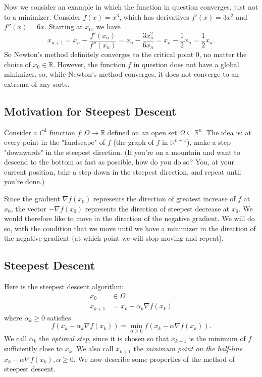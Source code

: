 \documentclass[11pt]{article}
\newcommand{\R}{\mathbb{R}}
\begin{document}
Now we consider an example in which the function in question converges, just not to a minimizer. Consider $f(x) = x^3$, which has derivatives $f'(x) = 3x^2$ and $f''(x) = 6x$. Starting at $x_0$, we have
\[
x_{n+1} = x_n - \frac{f'(x_n)}{f''(x_n)} = x_n - \frac{3x_n^2}{6x_n} = x_n - \frac{1}{2}x_n = \frac{1}{2}x_n.
\]
So Newton's method definitely converges to the critical point $0$, no matter the choice of $x_0 \in \R$. However, the function $f$ in question does not have a global minimizer, so, while Newton's method converges, it does not converge to an extrema of any sorts.

\subsection{Motivation for Steepest Descent}

Consider a $C^1$ function $f : \Omega \to \R$ defined on an open set $\Omega \subseteq \R^n$. The idea is: at every point in the "landscape" of $f$ (the graph of $f$ in $\R^{n+1}$), make a step "downwards" in the steepest direction. (If you're on a mountain and want to descend to the bottom as fast as possible, how do you do so? You, at your current position, take a step down in the steepest direction, and repeat until you're done.) 

Since the gradient $\nabla f(x_0)$ represents the direction of greatest increase of $f$ at $x_0$, the vector $-\nabla f(x_0)$ represents the direction of steepest decrease at $x_0$. We would therefore like to move in the direction of the negative gradient. We will do so, with the condition that we move until we have a minimizer in the direction of the negative gradient (at which point we will stop moving and repeat).

\subsection{Steepest Descent}

Here is the steepest descent algorithm:
\begin{align*}
x_0 &\in \Omega \\
x_{k+1} &= x_k - \alpha_k \nabla f(x_k)
\end{align*}
where $\alpha_k \geq 0$ satisfies 
\[
f(x_k - \alpha_k \nabla f(x_k)) = \min_{\alpha \geq 0} f(x_k - \alpha \nabla f(x_k)).
\]
We call $\alpha_k$ the \emph{optimal step}, since it is chosen so that $x_{k+1}$ is the minimum of $f$ sufficiently close to $x_k$. We also call $x_{k+1}$ the \emph{minimum point on the half-line} $x_k - \alpha \nabla f(x_k), \alpha \geq 0$. We now describe some properties of the method of steepest descent.
\end{document}
